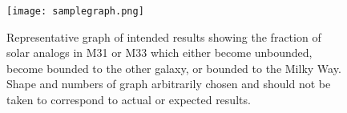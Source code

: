 \documentclass{aastex63}
\begin{document}
\begin{figure}
    \centering
    \texttt{[image: samplegraph.png]}
    \caption{Representative graph of intended results showing the fraction of solar analogs in M31 or M33 which either become unbounded, become bounded to the other galaxy, or bounded to the Milky Way. Shape and numbers of graph arbitrarily chosen and should not be taken to correspond to actual or expected results.}
    \label{samplegraph}
\end{figure}

{}

\end{document}
